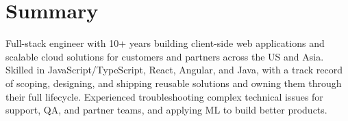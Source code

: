 \section{Summary}
Full-stack engineer with 10+ years building client-side web applications and scalable cloud solutions for customers and partners across the US and Asia. Skilled in JavaScript/TypeScript, React, Angular, and Java, with a track record of scoping, designing, and shipping reusable solutions and owning them through their full lifecycle. Experienced troubleshooting complex technical issues for support, QA, and partner teams, and applying ML to build better products.
